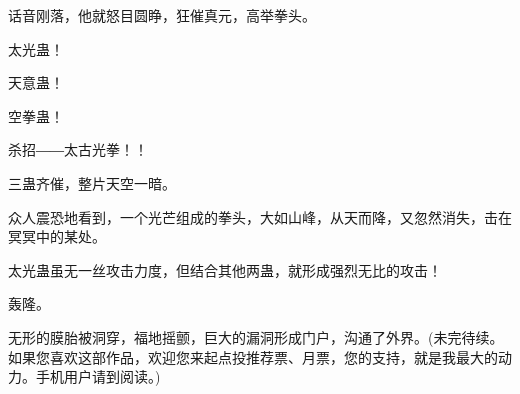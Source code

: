 \begin{this_body}
话音刚落，他就怒目圆睁，狂催真元，高举拳头。

太光蛊！

天意蛊！

空拳蛊！

杀招――太古光拳！！

三蛊齐催，整片天空一暗。

众人震恐地看到，一个光芒组成的拳头，大如山峰，从天而降，又忽然消失，击在冥冥中的某处。

太光蛊虽无一丝攻击力度，但结合其他两蛊，就形成强烈无比的攻击！

轰隆。

无形的膜胎被洞穿，福地摇颤，巨大的漏洞形成门户，沟通了外界。(未完待续。如果您喜欢这部作品，欢迎您来起点投推荐票、月票，您的支持，就是我最大的动力。手机用户请到阅读。)

\end{this_body}

